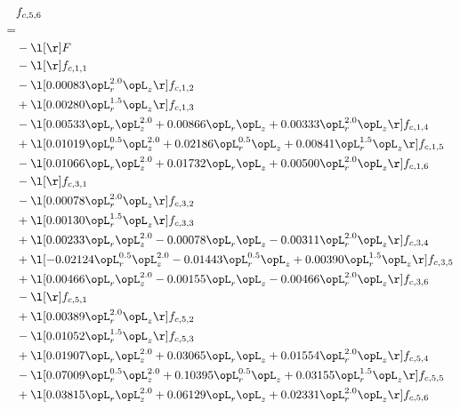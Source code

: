 \begin{alignat}{2} 
\label{eq:f_56_1} 
& f_{c,5,6} \nonumber \\ 
 = \\ 
& - \l[  \r] F \nonumber \\ 
& - \l[  \r] f_{c,1,1} \nonumber \\ 
& - \l[  0.00083 \opL_r^{2.0} \opL_z  \r] f_{c,1,2} \nonumber \\ 
& + \l[  0.00280 \opL_r^{1.5} \opL_z  \r] f_{c,1,3} \nonumber \\ 
& - \l[  0.00533 \opL_r \opL_z^{2.0} +  0.00866 \opL_r \opL_z +  0.00333 \opL_r^{2.0} \opL_z  \r] f_{c,1,4} \nonumber \\ 
& + \l[  0.01019 \opL_r^{0.5} \opL_z^{2.0} +  0.02186 \opL_r^{0.5} \opL_z +  0.00841 \opL_r^{1.5} \opL_z  \r] f_{c,1,5} \nonumber \\ 
& - \l[  0.01066 \opL_r \opL_z^{2.0} +  0.01732 \opL_r \opL_z +  0.00500 \opL_r^{2.0} \opL_z  \r] f_{c,1,6} \nonumber \\ 
& - \l[  \r] f_{c,3,1} \nonumber \\ 
& - \l[  0.00078 \opL_r^{2.0} \opL_z  \r] f_{c,3,2} \nonumber \\ 
& + \l[  0.00130 \opL_r^{1.5} \opL_z  \r] f_{c,3,3} \nonumber \\ 
& + \l[  0.00233 \opL_r \opL_z^{2.0}   -0.00078 \opL_r \opL_z   -0.00311 \opL_r^{2.0} \opL_z  \r] f_{c,3,4} \nonumber \\ 
& + \l[  -0.02124 \opL_r^{0.5} \opL_z^{2.0}   -0.01443 \opL_r^{0.5} \opL_z +  0.00390 \opL_r^{1.5} \opL_z  \r] f_{c,3,5} \nonumber \\ 
& + \l[  0.00466 \opL_r \opL_z^{2.0}   -0.00155 \opL_r \opL_z   -0.00466 \opL_r^{2.0} \opL_z  \r] f_{c,3,6} \nonumber \\ 
& - \l[  \r] f_{c,5,1} \nonumber \\ 
& + \l[  0.00389 \opL_r^{2.0} \opL_z  \r] f_{c,5,2} \nonumber \\ 
& - \l[  0.01052 \opL_r^{1.5} \opL_z  \r] f_{c,5,3} \nonumber \\ 
& + \l[  0.01907 \opL_r \opL_z^{2.0} +  0.03065 \opL_r \opL_z +  0.01554 \opL_r^{2.0} \opL_z  \r] f_{c,5,4} \nonumber \\ 
& - \l[  0.07009 \opL_r^{0.5} \opL_z^{2.0} +  0.10395 \opL_r^{0.5} \opL_z +  0.03155 \opL_r^{1.5} \opL_z  \r] f_{c,5,5} \nonumber \\ 
& + \l[  0.03815 \opL_r \opL_z^{2.0} +  0.06129 \opL_r \opL_z +  0.02331 \opL_r^{2.0} \opL_z  \r] f_{c,5,6} \nonumber \\ 

\end{alignat}
